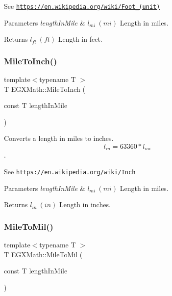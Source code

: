 See \href{https://en.wikipedia.org/wiki/Foot_(unit)}{\tt https\+://en.\+wikipedia.\+org/wiki/\+Foot\+\_\+(unit)} 
\begin{DoxyParams}{Parameters}
{\em length\+In\+Mile} & $ l_{mi}\ (mi)$ Length in miles. \\
\hline
\end{DoxyParams}
\begin{DoxyReturn}{Returns}
$ l_{ft}\ (ft)$ Length in feet. 
\end{DoxyReturn}
\mbox{\label{group___e_g_x_math-_conversions-_length_conversions-_imperial-_mile-_imperial_gaa00476d5ed2d329e62b2e68c283b6046}} 
\subsubsection{\texorpdfstring{Mile\+To\+Inch()}{MileToInch()}}
{\footnotesize\ttfamily template$<$typename T $>$ \\
T E\+G\+X\+Math\+::\+Mile\+To\+Inch (\begin{DoxyParamCaption}\item[{const T}]{length\+In\+Mile }\end{DoxyParamCaption})}



Converts a length in miles to inches. \[ l_{in}=63360 * l_{mi} \]. 

See \href{https://en.wikipedia.org/wiki/Inch}{\tt https\+://en.\+wikipedia.\+org/wiki/\+Inch} 
\begin{DoxyParams}{Parameters}
{\em length\+In\+Mile} & $ l_{mi}\ (mi)$ Length in miles. \\
\hline
\end{DoxyParams}
\begin{DoxyReturn}{Returns}
$ l_{in}\ (in)$ Length in inches. 
\end{DoxyReturn}
\mbox{\label{group___e_g_x_math-_conversions-_length_conversions-_imperial-_mile-_imperial_ga8f210f6be39b6ebd203e309b53556d22}} 
\subsubsection{\texorpdfstring{Mile\+To\+Mil()}{MileToMil()}}
{\footnotesize\ttfamily template$<$typename T $>$ \\
T E\+G\+X\+Math\+::\+Mile\+To\+Mil (\begin{DoxyParamCaption}\item[{const T}]{length\+In\+Mile }\end{DoxyParamCaption})}




